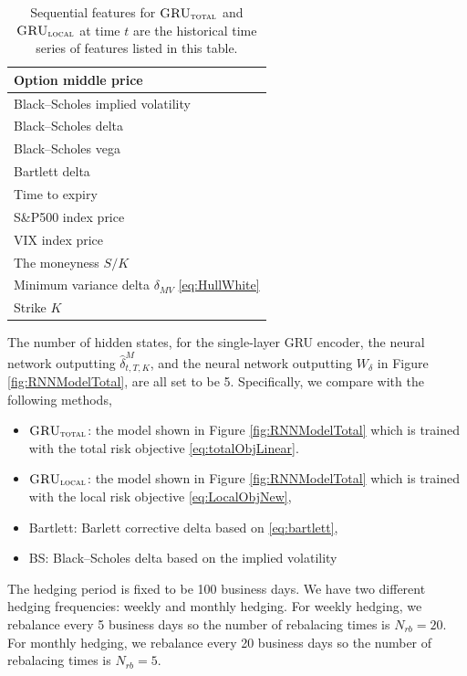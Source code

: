 \documentclass[letterpaper,12pt,titlepage,oneside,final]{book}
\numberwithin{equation}{section}
\theoremstyle{definition}
\newcommand{\modelT}{\textsc{GRU}_{\textsc{total}}}
\newcommand{\modelL}{\textsc{GRU}_{\textsc{local}}}
\begin{document}
\begin{table}[htp!]
	\centering
	\begin{tabular}{|l|}
		\hline
		Option middle price\\ \hline
		Black–Scholes implied volatility\\
		\hline
		Black–Scholes delta\\
		\hline
		Black–Scholes vega \\
		\hline
		Bartlett delta \\
		\hline
		Time to expiry \\\hline
		S\&P500 index price\\\hline
		VIX index price\\\hline
		The moneyness $S/K$\\\hline
		Minimum variance delta $\delta_{MV}$  \eqref{eq:HullWhite}\\\hline
		Strike $K$ \\   \hline
	\end{tabular}
	\caption{Sequential features for $\modelT$ and $\modelL$ at time $t$ are the historical time series of features listed in this table.}
\end{table}

The number of hidden states, for the single-layer GRU encoder, the neural network outputting $\widehat{\delta}^M_{t,T,K}$, and the neural network outputting $W_{\delta}$  in Figure \ref{fig:RNNModelTotal}, are all set to be 5.  Specifically, we compare with the following methods,
\begin{itemize}
	\item $\modelT$: the model shown in Figure \ref{fig:RNNModelTotal} which is trained with the total risk objective \eqref{eq:totalObjLinear}.
	\item $\modelL$: the model shown in Figure \ref{fig:RNNModelTotal} which is trained with the local risk objective \eqref{eq:LocalObjNew},
	\item Bartlett: Barlett corrective  delta based on \eqref{eq:bartlett},
	\item BS: Black–Scholes delta based on the implied volatility 
\end{itemize}
The hedging period is fixed to be 100 business days. We have two different hedging frequencies: weekly and monthly hedging. For weekly hedging, we rebalance every 5 business days so the number of rebalacing times is $N_{rb}=20$. For monthly hedging, we rebalance every 20 business days so the number of rebalacing times is $N_{rb}=5$.

 
\end{document}
